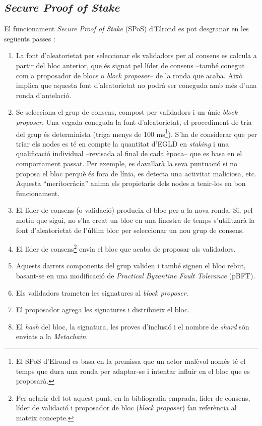 \documentclass[11pt,a4paper]{article}
\begin{document}
\subsection{\textit{Secure Proof of Stake}}
El funcionament \textit{Secure Proof of Stake} (SPoS) d'Elrond es pot desgranar en les següents passes \cite{elrond2022}\cite{elrond2019}: 
\begin{enumerate}
    \item La font d'aleatorietat per seleccionar els validadors per al consens es calcula a partir del bloc anterior, que és signat pel líder de consens –també conegut com a proposador de blocs o \textit{block proposer}– de la ronda que acaba. Això implica que aquesta font d'aleatorietat no podrà ser coneguda amb més d'una ronda d'antelació.
    \item Se selecciona el grup de consens, compost per validadors i un únic \textit{block proposer}. Una vegada coneguda la font d'aleatorietat, el procediment de tria del grup és determinista (triga menys de 100 ms\footnote{El SPoS d'Elrond es basa en la premissa que un actor malèvol només té el temps que dura una ronda per adaptar-se i intentar influir en el bloc que es proposarà.}). S'ha de considerar que per triar els nodes es té en compte la quantitat d'EGLD en \textit{staking} i una qualificació individual –revisada al final de cada època– que es basa en el comportament passat. Per exemple, es davallarà la seva puntuació si no proposa el bloc perquè és fora de línia, es detecta una activitat maliciosa, etc. Aquesta ``meritocràcia'' anima els propietaris dels nodes a tenir-los en bon funcionament. 
    \item  El líder de consens (o validació) produeix el  bloc per a la nova ronda. Si, pel motiu que sigui, no s'ha creat un bloc en una finestra de temps s'utilitzarà la font d'aleatorietat de l'últim bloc per seleccionar un nou grup de consens.
    \item El líder de consens\footnote{Per aclarir del tot aquest punt, en la bibliografia emprada, líder de consens, líder de validació i proposador de bloc (\textit{block proposer}) fan referència al mateix concepte.} envia el bloc que acaba de proposar als validadors.
    \item  Aquests darrers components del grup validen i també signen el bloc rebut, basant-se en una modificació de \textit{Practical Byzantine Fault Tolerance} (pBFT).
    \item Els validadors trameten les signatures al \textit{block proposer}.
    \item El proposador agrega les signatures i distribueix el bloc.
    \item El \textit{hash} del bloc, la signatura, les proves d'inclusió i el nombre de \textit{shard} són enviats a la \textit{Metachain}. 
\end{enumerate}
\end{document}
